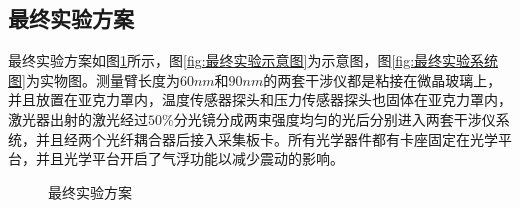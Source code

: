 \subsection{最终实验方案}
最终实验方案如图\ref{fig:最终实验方案}所示，图\ref{fig:最终实验示意图}为示意图，图\ref{fig:最终实验系统图}为实物图。测量臂长度为$60nm$和$90nm$的两套干涉仪都是粘接在微晶玻璃上，并且放置在亚克力罩内，温度传感器探头和压力传感器探头也固体在亚克力罩内，激光器出射的激光经过$50\%$分光镜分成两束强度均匀的光后分别进入两套干涉仪系统，并且经两个光纤耦合器后接入采集板卡。所有光学器件都有卡座固定在光学平台，并且光学平台开启了气浮功能以减少震动的影响。
\begin{figure}[htb]
    \centering
    \caption{最终实验方案}
    \label{fig:最终实验方案}
  \end{figure}

